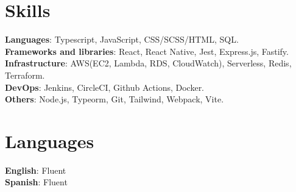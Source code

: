 \documentclass[letterpaper,11pt]{article}
\begin{document}
\begin{minipage}[t]{.78\textwidth}
  \section{Skills}
  \begin{itemize}[leftmargin=0.15in, label={}]
      \small{\item{
      \textbf{Languages}{: Typescript, JavaScript, CSS/SCSS/HTML, SQL.} \\
      \textbf{Frameworks and libraries}{: React, React Native, Jest, Express.js, Fastify.} \\
      \textbf{Infrastructure}{: AWS(EC2, Lambda, RDS, CloudWatch), Serverless, Redis, Terraform.} \\
      \textbf{DevOps}{: Jenkins, CircleCI, Github Actions, Docker.} \\
      \textbf{Others}{: Node.js, Typeorm, Git, Tailwind, Webpack, Vite.} \\
      }}
  \end{itemize}
\end{minipage}\hspace{.02\textwidth}%
\begin{minipage}[t]{.20\textwidth}
  \section{Languages}
  \begin{itemize}[leftmargin=0.0in, label={}]
      \small{\item{
      \textbf{English}{: Fluent} \\
      \textbf{Spanish}{: Fluent} \\
      }}
  \end{itemize}
\end{minipage}\vspace{-10pt}
\end{document}

